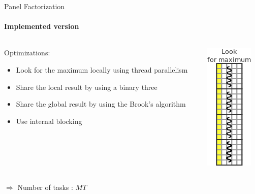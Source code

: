 \documentclass{beamer}
\begin{document}
\begin{frame}{Panel Factorization}
\framesubtitle{Implemented version}
\begin{columns}
\begin{column}{.70\textwidth}
Optimizations:
\begin{itemize}
\item Look for the maximum locally using thread parallelism
\item Share the local result by using a binary three
\item Share the global result by using the Brook's algorithm
\item Use internal blocking
\end{itemize}
\end{column}
\hfill
\begin{column}{.30\textwidth}
\begin{center}
\includegraphics[scale=0.8]{panel_max_opt1.png}
\end{center}
\end{column}
\end{columns}
\pause
\begin{exampleblock}{}
$\Longrightarrow$ Number of tasks : $MT$
\end{exampleblock}{}
\end{frame}
\end{document}
